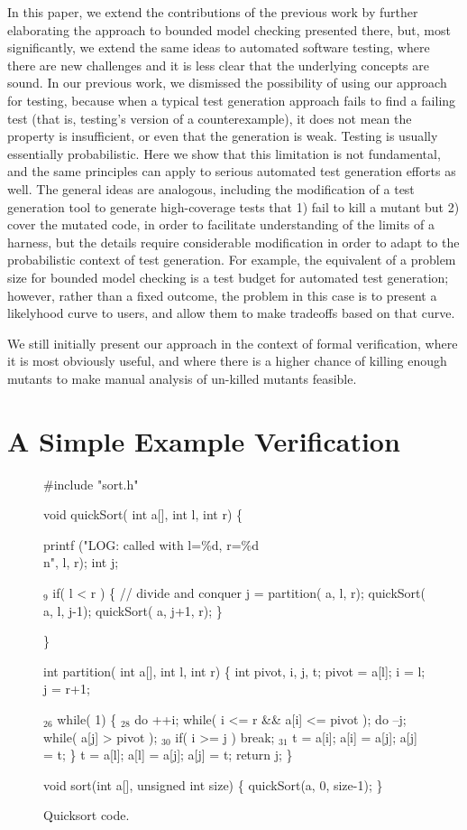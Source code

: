 \documentclass{svjour3}
\begin{document}
In this paper, we extend the contributions of the previous work by
further elaborating the approach to bounded model checking presented
there, but, most significantly, we extend the same ideas to automated
software testing, where there are new challenges and it is less clear
that the underlying concepts are sound.  In our previous work, we
dismissed the possibility of using our approach for testing, because
when a typical test generation approach fails to find a failing test
(that is, testing's version of a counterexample), it does not mean the
property is insufficient, or even that the generation is weak.
Testing is usually essentially probabilistic.  Here we show that this
limitation is not fundamental, and the same principles can apply to
serious automated test generation efforts as well.  The general ideas
are analogous, including the modification of a test generation tool to
generate high-coverage tests that 1) fail to kill a mutant but 2)
cover the mutated code, in order to facilitate understanding of the
limits of a harness, but the details require considerable modification
in order to adapt to the probabilistic context of test generation.
For example, the equivalent of a problem size for bounded model
checking is a test budget for automated test generation; however,
rather than a fixed outcome, the problem in this case is to present a
likelyhood curve to users, and allow them to make tradeoffs based on
that curve.

We still initially present our approach in the context of formal
verification, where it is most obviously useful, and where there is a
higher chance of killing enough mutants to make manual analysis of
un-killed mutants feasible.

\section{A Simple Example Verification}

\begin{figure}
{\scriptsize
\begin{code}
 \#include "sort.h"

 void quickSort( int a[], int l, int r)
 \{

   printf ("LOG: called with l=\%d, r=\%d\\n", l, r); 
   int j;

{$_9$}  if( l < r ) 
     \{
       // divide and conquer
       j = partition( a, l, r);
       quickSort( a, l, j-1);
       quickSort( a, j+1, r);
     \}
  
 \}

 int partition( int a[], int l, int r) \{
   int pivot, i, j, t;
   pivot = a[l];
   i = l; j = r+1;
  
{$_{26}$} while( 1)
     \{
{$_{28}$}     do ++i; while( i <= r \&\& a[i] <= pivot );
       do --j; while( a[j] > pivot );
{$_{30}$}     if( i >= j ) break;
{$_{31}$}     t = a[i]; a[i] = a[j]; a[j] = t;
     \}
   t = a[l]; a[l] = a[j]; a[j] = t;
   return j;
 \}


 void sort(int a[], unsigned int size) \{
   quickSort(a, 0, size-1);
 \}
\end{code}
}
\caption{Quicksort code.}
\label{fig:qsort}
\end{figure}
\end{document}
